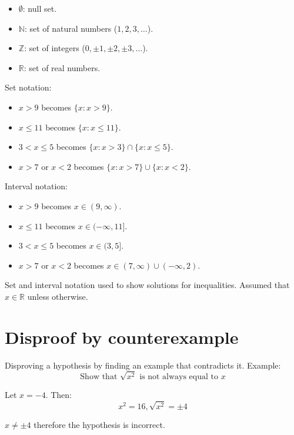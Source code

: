 \documentclass[a4paper]{report}
\begin{document}
\begin{itemize}
	\item{\( \emptyset \): null set.}
	\item{\( \mathbb{N} \): set of natural numbers (\( 1, 2, 3, \dots \)).}
	\item{\( \mathbb{Z} \): set of integers (\(0, \pm1, \pm2, \pm3, \dots \)).}
	\item{\( \mathbb{R} \):  set of real numbers.} 
\end{itemize}

Set notation:

\begin{itemize}
	\item{\( x > 9 \) becomes \( \{ x : x > 9 \} \).}
	\item{\( x \leq 11 \) becomes \( \{ x : x \leq 11 \} \).}
	\item{\( 3 < x \leq 5 \) becomes \( \{ x : x > 3 \} \cap \{ x : x \leq 5 \} \).}
	\item{\( x > 7 \) or \( x < 2 \) becomes \( \{ x : x > 7 \} \cup \{ x : x < 2 \} \).}
\end{itemize}

Interval notation:

\begin{itemize}
	\item{\( x > 9 \) becomes \( x \in (9, \infty) \).}
	\item{\( x \leq 11 \) becomes \( x \in (-\infty, 11] \).}
	\item{\( 3 < x \leq 5 \) becomes \( x \in (3, 5] \).}
	\item{\( x > 7 \) or \( x < 2 \) becomes \( x \in (7, \infty) \cup (-\infty, 2) \).}
\end{itemize}

Set and interval notation used to show solutions for inequalities. Assumed that
\( x \in \mathbb{R} \) unless otherwise.

\section{Disproof by counterexample}

Disproving a hypothesis by finding an example that contradicts it. Example: \[ \text{Show that }
\sqrt{x^2} \text{ is not always equal to }  x \]

Let \( x = -4 \). Then: \[ x^2 = 16, \sqrt{x^2} = \pm 4 \]

\( x \neq \pm 4 \) therefore the hypothesis is incorrect.
\end{document}
